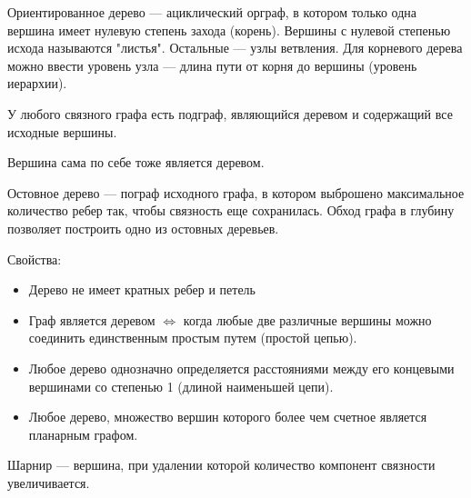 \documentclass[a4paper,12pt]{article}
\theoremstyle{plain} %
\theoremstyle{definition} %
\theoremstyle{remark} %
\begin{document}
Ориентированное дерево --- ациклический орграф, в котором только одна вершина имеет нулевую степень захода (корень).
Вершины с нулевой степенью исхода называются "листья". Остальные --- узлы ветвления. Для корневого дерева можно ввести уровень узла --- длина пути от корня до вершины (уровень иерархии).

У любого связного графа есть подграф, являющийся деревом и содержащий все исходные вершины.

Вершина сама по себе тоже является деревом.

Остовное дерево --- пограф исходного графа, в котором выброшено максимальное количество ребер так, чтобы связность еще сохранилась. Обход графа в глубину позволяет построить одно из остовных деревьев.

Свойства:
\begin{itemize}
	\item Дерево не имеет кратных ребер и петель
	\item Граф является деревом $\Leftrightarrow$ когда любые две различные вершины можно соединить  единственным простым путем (простой цепью).
	\item Любое дерево однозначно определяется расстояниями между его концевыми вершинами со степенью 1 (длиной наименьшей цепи).
	\item Любое дерево, множество вершин которого более чем счетное является планарным графом.
\end{itemize}

Шарнир --- вершина, при удалении которой количество компонент связности увеличивается.
\end{document}

